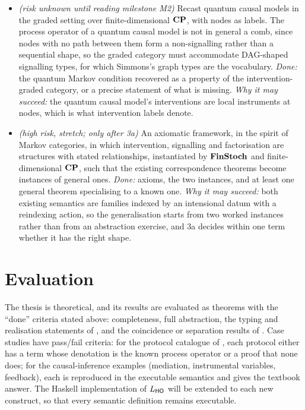 \begin{itemize}[nosep]
\item[3b] \textit{(risk unknown until reading milestone M2)} Recast quantum causal models \cite{barrett2019quantumcausalmodels} in the graded setting over finite-dimensional $\mathbf{CP}$, with nodes as labels. The process operator of a quantum causal model is not in general a comb, since nodes with no path between them form a non-signalling rather than a sequential shape, so the graded category must accommodate DAG-shaped signalling types, for which Simmons's graph types \cite{simmons2024thesis} are the vocabulary. \emph{Done:} the quantum Markov condition recovered as a property of the intervention-graded category, or a precise statement of what is missing. \emph{Why it may succeed:} the quantum causal model's interventions are local instruments at nodes, which is what intervention labels denote.
\item[3c] \textit{(high risk, stretch; only after 3a)} An axiomatic framework, in the spirit of Markov categories, in which intervention, signalling and factorisation are structures with stated relationships, instantiated by $\mathbf{FinStoch}$ and finite-dimensional $\mathbf{CP}$, such that the existing correspondence theorems become instances of general ones. \emph{Done:} axioms, the two instances, and at least one general theorem specialising to a known one. \emph{Why it may succeed:} both existing semantics are families indexed by an intensional datum with a reindexing action, so the generalisation starts from two worked instances rather than from an abstraction exercise, and 3a decides within one term whether it has the right shape.
\end{itemize}

\section{Evaluation}

The thesis is theoretical, and its results are evaluated as theorems with the ``done'' criteria stated above: completeness, full abstraction, the typing and realisation statements of , and the coincidence or separation results of . Case studies have pass/fail criteria: for the protocol catalogue of , each protocol either has a term whose denotation is the known process operator or a proof that none does; for the causal-inference examples (mediation, instrumental variables, feedback), each is reproduced in the executable semantics and gives the textbook answer. The Haskell implementation of $L_{\mathsf{HO}}$ \cite{ARTIFACT_wang_2026_23207221} will be extended to each new construct, so that every semantic definition remains executable.


